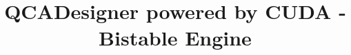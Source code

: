 \documentclass[a4paper,12pt]{report}
\begin{document}
\title{QCADesigner powered by CUDA - Bistable Engine}

\providecommand{\primoautore}{Gibilisco~\sc{Giovanni Paolo}}               
\providecommand{\primamatricola}{755066}            
\providecommand{\secondoautore}{Marconi~\sc{Francesco}}
\providecommand{\secondamatricola}{755439}
\providecommand{\terzoautore}{Miglierina~\sc{Marco}}
\providecommand{\terzamatricola}{754848}
\providecommand{\instructor}{Prof.ssa Sciuto~\sc{Donatella}}  
\providecommand{\tutor}{Redaelli~\sc{Francesco}, Cancar�~\sc{Fabio}}
\providecommand{\annoacc}{2009-2010}

\titlfp

\titlepage

\headsep 2cm

\setlength{\headwidth}{\textwidth}
  \fancyhead[R]{}


	\fancyfoot[C]{\thepage}
	\renewcommand{\footrulewidth}{0.4pt}

\newpage

\tableofcontents

\newpage

\listoffigures




\newpage


\newpage


\newpage


\newpage



\newpage



\newpage



\newpage




\end{document}
